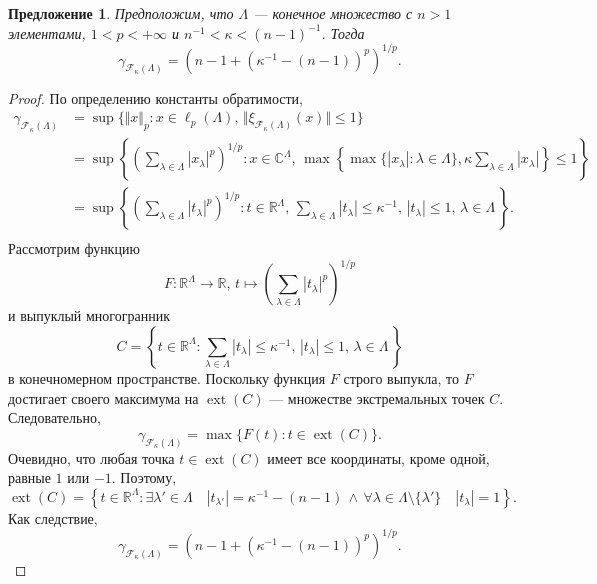 \documentclass[12pt]{article}
\newtheorem{proposition}[theorem]{Предложение}
\begin{document}
\begin{proposition}\label{StdEmbdSpclCoerciv}
    Предположим, что $\Lambda$ --- конечное множество с $n>1$ 
    элементами, $1<p<+\infty$ и $n^{-1}<\kappa<(n-1)^{-1}$. Тогда
    \[
        \gamma_{\mathcal{F}_{\kappa}(\Lambda)}
        =(n-1+(\kappa^{-1}-(n-1))^p)^{1/p}.
    \]
\end{proposition}
\begin{proof}
    По определению константы обратимости,
    \[
    \begin{aligned}
        \gamma_{\mathcal{F}_{\kappa}(\Lambda)}
        &=\sup\{
            \Vert x\Vert_p : 
            x\in\ell_p(\Lambda),\, 
            \Vert \xi_{\mathcal{F}_{\kappa}(\Lambda)}(x)\Vert\leq 1
        \} \\
        &=\sup\left\{
            \left( \sum_{\lambda\in\Lambda} |x_\lambda|^p\right)^{1/p} : 
            x\in\mathbb{C}^\Lambda,\, 
            \max\left\{
                \max\{|x_\lambda|:\lambda\in\Lambda\},
                \kappa\sum_{\lambda\in\Lambda} |x_\lambda|
            \right\}\leq 1
        \right\} \\
        &=\sup\left\{
            \left( \sum_{\lambda\in\Lambda} |t_\lambda|^p\right)^{1/p} : 
            t\in\mathbb{R}^\Lambda,\, 
            \sum_{\lambda\in\Lambda} |t_\lambda|\leq \kappa^{-1},\,
            |t_\lambda|\leq 1,\,\lambda\in\Lambda\,
        \right\}. \\
    \end{aligned}
    \]
    Рассмотрим функцию
    \[
        F:
        \mathbb{R}^\Lambda\to\mathbb{R},\, 
        t\mapsto \left(\sum_{\lambda\in\Lambda}|t_\lambda|^p\right)^{1/p}
    \]
    и выпуклый многогранник
    \[
        C=\left\{ 
            t\in\mathbb{R}^\Lambda : 
            \sum_{\lambda\in\Lambda} |t_\lambda|\leq \kappa^{-1},\,
            |t_\lambda|\leq 1,\,\lambda\in\Lambda\,
        \right\}
    \]
    в конечномерном пространстве. Поскольку функция $F$ строго выпукла, то $F$ 
    достигает своего максимума на $\operatorname{ext}(C)$ --- множестве 
    экстремальных точек $C$. Следовательно,
    \[
        \gamma_{\mathcal{F}_{\kappa}(\Lambda)}=\max\{
            F(t):t\in\operatorname{ext}(C)
        \}.
    \]
    Очевидно, что любая точка $t\in \operatorname{ext}(C)$ имеет все координаты, кроме одной,
    равные $1$ или $-1$. Поэтому,
    \[
        \operatorname{ext}(C)=\left\{ 
            t\in\mathbb{R}^\Lambda : 
            \exists \lambda'\in\Lambda\quad |t_{\lambda'}|=\kappa^{-1}-(n-1)\,
            \wedge\, 
            \forall \lambda\in\Lambda\setminus\{\lambda'\}\quad |t_\lambda|=1
        \right\}.
    \]
    Как следствие,
    \[
        \gamma_{\mathcal{F}_{\kappa}(\Lambda)}=(n-1+(\kappa^{-1}-(n-1))^p)^{1/p}.
    \]
\end{proof}
\end{document}
